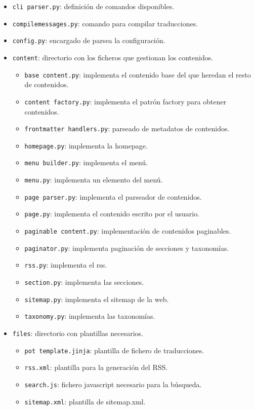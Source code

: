 \begin{itemize}
\item \texttt{cli parser.py}: definición de comandos disponibles.
\item \texttt{compilemessages.py}: comando para compilar traducciones.
\item \texttt{config.py}: encargado de parsea la configuración.
\item \texttt{content}: directorio con los ficheros que gestionan los contenidos.
    \begin{itemize}
        \item \texttt{base content.py}: implementa el contenido base del que heredan el resto de contenidos.
       \item \texttt{content factory.py}: implementa el patrón factory para obtener contenidos.
       \item \texttt{frontmatter handlers.py}: parseado de metadatos de contenidos.
       \item \texttt{homepage.py}: implementa la homepage.
       \item \texttt{menu builder.py}: implementa el menú.
       \item \texttt{menu.py}: implementa un elemento del menú.
       \item \texttt{page parser.py}: implementa el parseador de contenidos.
       \item \texttt{page.py}: implementa el contenido escrito por el usuario.
       \item \texttt{paginable content.py}: implementación de contenidos paginables.
       \item \texttt{paginator.py}: implementa paginación de secciones y taxonomías.
       \item \texttt{rss.py}: implementa el rss.
       \item \texttt{section.py}: implementa las secciones.
       \item \texttt{sitemap.py}: implementa el sitemap de la web.
       \item \texttt{taxonomy.py}: implementa las taxonomías.
    \end{itemize}

\item \texttt{files}: directorio con plantillas necesarios.
    \begin{itemize}
        \item \texttt{pot template.jinja}: plantilla de fichero de traducciones.
       \item \texttt{rss.xml}: plantilla para la generación del RSS.
       \item \texttt{search.js}: fichero javascript necesario para la búsqueda.
       \item \texttt{sitemap.xml}: plantilla de sitemap.xml.
    \end{itemize}


\end{itemize}
